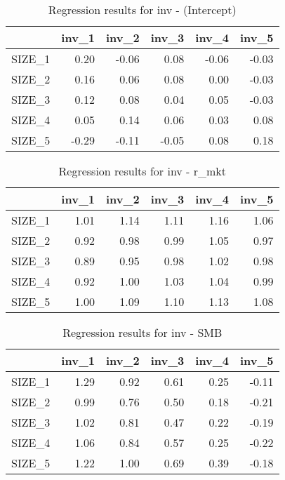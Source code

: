 \begin{table}[ht]
\centering
\caption{Regression results for inv - (Intercept)} 
\begin{tabular}{rrrrrr}
  \hline
 & inv\_1 & inv\_2 & inv\_3 & inv\_4 & inv\_5 \\ 
  \hline
SIZE\_1 & 0.20 & -0.06 & 0.08 & -0.06 & -0.03 \\ 
  SIZE\_2 & 0.16 & 0.06 & 0.08 & 0.00 & -0.03 \\ 
  SIZE\_3 & 0.12 & 0.08 & 0.04 & 0.05 & -0.03 \\ 
  SIZE\_4 & 0.05 & 0.14 & 0.06 & 0.03 & 0.08 \\ 
  SIZE\_5 & -0.29 & -0.11 & -0.05 & 0.08 & 0.18 \\ 
   \hline
\end{tabular}
\end{table}


\begin{table}[ht]
\centering
\caption{Regression results for inv - r_mkt} 
\begin{tabular}{rrrrrr}
  \hline
 & inv\_1 & inv\_2 & inv\_3 & inv\_4 & inv\_5 \\ 
  \hline
SIZE\_1 & 1.01 & 1.14 & 1.11 & 1.16 & 1.06 \\ 
  SIZE\_2 & 0.92 & 0.98 & 0.99 & 1.05 & 0.97 \\ 
  SIZE\_3 & 0.89 & 0.95 & 0.98 & 1.02 & 0.98 \\ 
  SIZE\_4 & 0.92 & 1.00 & 1.03 & 1.04 & 0.99 \\ 
  SIZE\_5 & 1.00 & 1.09 & 1.10 & 1.13 & 1.08 \\ 
   \hline
\end{tabular}
\end{table}


\begin{table}[ht]
\centering
\caption{Regression results for inv - SMB} 
\begin{tabular}{rrrrrr}
  \hline
 & inv\_1 & inv\_2 & inv\_3 & inv\_4 & inv\_5 \\ 
  \hline
SIZE\_1 & 1.29 & 0.92 & 0.61 & 0.25 & -0.11 \\ 
  SIZE\_2 & 0.99 & 0.76 & 0.50 & 0.18 & -0.21 \\ 
  SIZE\_3 & 1.02 & 0.81 & 0.47 & 0.22 & -0.19 \\ 
  SIZE\_4 & 1.06 & 0.84 & 0.57 & 0.25 & -0.22 \\ 
  SIZE\_5 & 1.22 & 1.00 & 0.69 & 0.39 & -0.18 \\ 
   \hline
\end{tabular}
\end{table}


